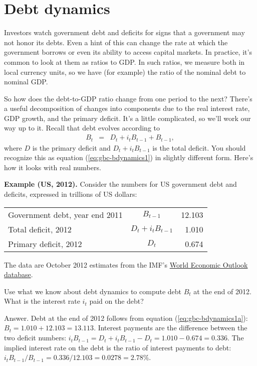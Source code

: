 %
\section{Debt dynamics}

Investors watch government debt and deficits
for signs that a government may not honor its debts.
Even a hint of this can change the rate at which the government
borrows or even its ability to access capital markets.
In practice, it's common to look at them as ratios to GDP.
In such ratios, we measure both in local currency units,
so we have (for example) the ratio of the nominal debt to nominal GDP.

So how does the debt-to-GDP ratio change from one period to the next?
There's a useful decomposition of changes
into components due to the real interest rate, GDP growth, and the
primary deficit.
It's a little complicated, so we'll work our way up to it.
Recall that debt evolves according to
\begin{eqnarray}
    B_{t} &=& D_t + i_t B_{t-1} + B_{t-1}  ,
    \label{eq:gbc-bdynamics1a}
\end{eqnarray}
where $D$ is the primary deficit
and $D_t + i_t B_{t-1}$ is the total deficit.
You should recognize this as equation (\ref{eq:gbc-bdynamics1})
in slightly different form.
Here's how it looks with real numbers.

{\bf Example (US, 2012).}
Consider the numbers for US government debt and deficits,
expressed in trillions of US dollars:

\begin{center}
\begin{tabular}{lcr}
\toprule
%
Government debt, year end 2011  &  $B_{t-1}$    & 12.103 \\
Total deficit, 2012             &  $ D_t + i_t B_{t-1}$ & 1.010 \\
Primary deficit, 2012           &  $D_t$        &  0.674 \\
\bottomrule
\end{tabular}
\end{center}

The data are October 2012 estimates from the IMF's
\href{http://www.imf.org/external/ns/cs.aspx?id=28}{World Economic Outlook database}.

Use what we know about debt dynamics to compute debt $B_t$ at the end of 2012.
What is the interest rate $i_t$ paid on the debt?

Answer.
Debt at the end of 2012 follows from equation (\ref{eq:gbc-bdynamics1a}):
$B_t = 1.010 + 12.103 = 13.113$.
Interest payments are the difference between the two deficit numbers:
$ i_t B_{t-1} = D_t + i_t B_{t-1} - D_t = 1.010 - 0.674 = 0.336 $.
The implied interest rate on the debt is
the ratio of interest payments to debt:
$ i_t B_{t-1}/B_{t-1} = 0.336/12.103 = 0.0278 = 2.78\%$.


